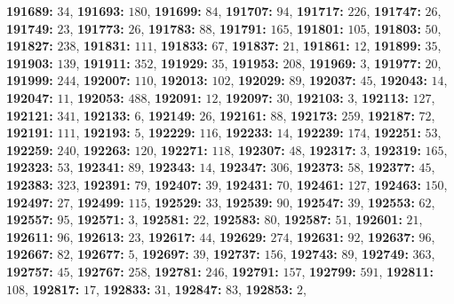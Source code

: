 \textsf{\bfseries 191689:} $34$, \textsf{\bfseries 191693:} $180$, \textsf{\bfseries 191699:} $84$, \textsf{\bfseries 191707:} $94$, \textsf{\bfseries 191717:} $226$, \textsf{\bfseries 191747:} $26$, \textsf{\bfseries 191749:} $23$, \textsf{\bfseries 191773:} $26$, \textsf{\bfseries 191783:} $88$, \textsf{\bfseries 191791:} $165$, \textsf{\bfseries 191801:} $105$, \textsf{\bfseries 191803:} $50$, \textsf{\bfseries 191827:} $238$, \textsf{\bfseries 191831:} $111$, \textsf{\bfseries 191833:} $67$, \textsf{\bfseries 191837:} $21$, \textsf{\bfseries 191861:} $12$, \textsf{\bfseries 191899:} $35$, \textsf{\bfseries 191903:} $139$, \textsf{\bfseries 191911:} $352$, \textsf{\bfseries 191929:} $35$, \textsf{\bfseries 191953:} $208$, \textsf{\bfseries 191969:} $3$, \textsf{\bfseries 191977:} $20$, \textsf{\bfseries 191999:} $244$, \textsf{\bfseries 192007:} $110$, \textsf{\bfseries 192013:} $102$, \textsf{\bfseries 192029:} $89$, \textsf{\bfseries 192037:} $45$, \textsf{\bfseries 192043:} $14$, \textsf{\bfseries 192047:} $11$, \textsf{\bfseries 192053:} $488$, \textsf{\bfseries 192091:} $12$, \textsf{\bfseries 192097:} $30$, \textsf{\bfseries 192103:} $3$, \textsf{\bfseries 192113:} $127$, \textsf{\bfseries 192121:} $341$, \textsf{\bfseries 192133:} $6$, \textsf{\bfseries 192149:} $26$, \textsf{\bfseries 192161:} $88$, \textsf{\bfseries 192173:} $259$, \textsf{\bfseries 192187:} $72$, \textsf{\bfseries 192191:} $111$, \textsf{\bfseries 192193:} $5$, \textsf{\bfseries 192229:} $116$, \textsf{\bfseries 192233:} $14$, \textsf{\bfseries 192239:} $174$, \textsf{\bfseries 192251:} $53$, \textsf{\bfseries 192259:} $240$, \textsf{\bfseries 192263:} $120$, \textsf{\bfseries 192271:} $118$, \textsf{\bfseries 192307:} $48$, \textsf{\bfseries 192317:} $3$, \textsf{\bfseries 192319:} $165$, \textsf{\bfseries 192323:} $53$, \textsf{\bfseries 192341:} $89$, \textsf{\bfseries 192343:} $14$, \textsf{\bfseries 192347:} $306$, \textsf{\bfseries 192373:} $58$, \textsf{\bfseries 192377:} $45$, \textsf{\bfseries 192383:} $323$, \textsf{\bfseries 192391:} $79$, \textsf{\bfseries 192407:} $39$, \textsf{\bfseries 192431:} $70$, \textsf{\bfseries 192461:} $127$, \textsf{\bfseries 192463:} $150$, \textsf{\bfseries 192497:} $27$, \textsf{\bfseries 192499:} $115$, \textsf{\bfseries 192529:} $33$, \textsf{\bfseries 192539:} $90$, \textsf{\bfseries 192547:} $39$, \textsf{\bfseries 192553:} $62$, \textsf{\bfseries 192557:} $95$, \textsf{\bfseries 192571:} $3$, \textsf{\bfseries 192581:} $22$, \textsf{\bfseries 192583:} $80$, \textsf{\bfseries 192587:} $51$, \textsf{\bfseries 192601:} $21$, \textsf{\bfseries 192611:} $96$, \textsf{\bfseries 192613:} $23$, \textsf{\bfseries 192617:} $44$, \textsf{\bfseries 192629:} $274$, \textsf{\bfseries 192631:} $92$, \textsf{\bfseries 192637:} $96$, \textsf{\bfseries 192667:} $82$, \textsf{\bfseries 192677:} $5$, \textsf{\bfseries 192697:} $39$, \textsf{\bfseries 192737:} $156$, \textsf{\bfseries 192743:} $89$, \textsf{\bfseries 192749:} $363$, \textsf{\bfseries 192757:} $45$, \textsf{\bfseries 192767:} $258$, \textsf{\bfseries 192781:} $246$, \textsf{\bfseries 192791:} $157$, \textsf{\bfseries 192799:} $591$, \textsf{\bfseries 192811:} $108$, \textsf{\bfseries 192817:} $17$, \textsf{\bfseries 192833:} $31$, \textsf{\bfseries 192847:} $83$, \textsf{\bfseries 192853:} $2$, 
